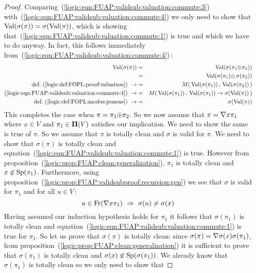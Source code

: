 \begin{proof}
Comparing~(\ref{logic:eqn:FUAP:validsub:valuation:commute:3})
with~(\ref{logic:eqn:FUAP:validsub:valuation:commute:4}) we only
need to show that $\mbox{\rm Val}(\sigma(\pi))=\sigma(\mbox{\rm Val}(\pi))$, which is
showing that~(\ref{logic:eqn:FUAP:validsub:valuation:commute:1}) is
true and which we have to do anyway. In fact, this follows
immediately
from~(\ref{logic:eqn:FUAP:validsub:valuation:commute:4})\,:
    \begin{eqnarray*}
    \val(\sigma(\pi))&=&\val(\sigma(\pi_{1}\pon\pi_{2}))\\
    &=&\val(\sigma(\pi_{1})\pon\,\sigma(\pi_{2}))\\
    \mbox{def.~(\ref{logic:def:FOPL:proof:valuation})}\ \rightarrow
    &=&M(\,\val(\sigma(\pi_{1}))\,,\,\val(\sigma(\pi_{2}))\,)\\
    \mbox{(\ref{logic:eqn:FUAP:validsub:valuation:commute:4})}\ \rightarrow
    &=&M(\,\val(\sigma(\pi_{1}))\,,\,\val(\sigma(\pi_{1}))\to\sigma(\val(\pi))\,)\\
    \mbox{def.~(\ref{logic:def:FOPL:modus:ponens})}\ \rightarrow
    &=&\sigma(\val(\pi))
    \end{eqnarray*}
This completes the case when $\pi=\pi_{1}\mbox{$\oplus$}\pi_{2}$. So we now
assume that $\pi=\mbox{$\nabla$} x\pi_{1}$ where $x\in V$ and $\pi_{1}\in\mbox{${\bf\Pi}(V)$}$
satisfies our implication. We need to show the same is true of
$\pi$. So we assume that $\pi$ is totally clean and $\sigma$ is
valid for $\pi$. We need to show that $\sigma(\pi)$ is totally clean
and equation~(\ref{logic:eqn:FUAP:validsub:valuation:commute:1}) is
true. However from
proposition~(\ref{logic:prop:FUAP:clean:generalization}), $\pi_{1}$
is totally clean and $x\not\in\mbox{\rm Sp}(\pi_{1})$. Furthermore, using
proposition~(\ref{logic:prop:FUAP:validsubproof:recursion:gen}) we
see that $\sigma$ is valid for $\pi_{1}$ and for all $u\in V$\,:
    \begin{equation}\label{logic:eqn:FUAP:validsub:valuation:commute:5}
    u\in\mbox{\rm Fr}(\mbox{$\nabla$} x\pi_{1})\ \Rightarrow\
    \sigma(u)\neq\sigma(x)
    \end{equation}
Having assumed our induction hypothesis holds for $\pi_{1}$ it
follows that $\sigma(\pi_{1})$ is totally clean and
equation~(\ref{logic:eqn:FUAP:validsub:valuation:commute:1}) is true
for $\pi_{1}$. So let us prove that $\sigma(\pi)$ is totally clean:
since $\sigma(\pi)=\mbox{$\nabla$}\sigma(x)\sigma(\pi_{1})$, from
proposition~(\ref{logic:prop:FUAP:clean:generalization}) it is
sufficient to prove that $\sigma(\pi_{1})$ is totally clean and
$\sigma(x)\not\in\mbox{\rm Sp}(\sigma(\pi_{1}))$. We already know that
$\sigma(\pi_{1})$ is totally clean so we only need to show that

\end{proof}
